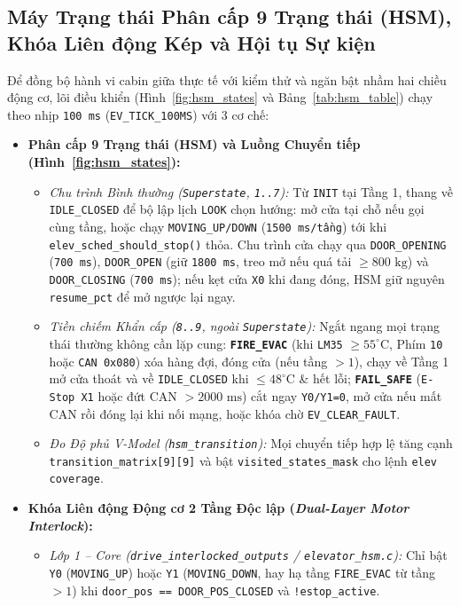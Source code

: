 \subsection{Máy Trạng thái Phân cấp 9 Trạng thái (HSM), Khóa Liên động Kép và Hội tụ Sự kiện}
Để đồng bộ hành vi cabin giữa thực tế với kiểm thử và ngăn bật nhầm hai chiều động cơ, lõi điều khiển (Hình~\ref{fig:hsm_states} và Bảng~\ref{tab:hsm_table}) chạy theo nhịp \texttt{100~ms} (\texttt{EV\_TICK\_100MS}) với 3 cơ chế:
\begin{itemize}[nosep]
    \item \textbf{Phân cấp 9 Trạng thái (HSM) và Luồng Chuyển tiếp (Hình~\ref{fig:hsm_states}):}
    \begin{itemize}[nosep]
        \item \textit{Chu trình Bình thường (\texttt{Superstate}, \texttt{1..7}):} Từ \texttt{INIT} tại Tầng 1, thang về \texttt{IDLE\_CLOSED} để bộ lập lịch \texttt{LOOK} chọn hướng: mở cửa tại chỗ nếu gọi cùng tầng, hoặc chạy \texttt{MOVING\_UP/DOWN} (\texttt{1500~ms/tầng}) tới khi \texttt{elev\_sched\_should\_stop()} thỏa. Chu trình cửa chạy qua \texttt{DOOR\_OPENING} (\texttt{700~ms}), \texttt{DOOR\_OPEN} (giữ \texttt{1800~ms}, treo mở nếu quá tải $\ge 800\text{ kg}$) và \texttt{DOOR\_CLOSING} (\texttt{700~ms}); nếu kẹt cửa \texttt{X0} khi đang đóng, HSM giữ nguyên \texttt{resume\_pct} để mở ngược lại ngay.
        \item \textit{Tiền chiếm Khẩn cấp (\texttt{8..9}, ngoài \texttt{Superstate}):} Ngắt ngang mọi trạng thái thường không cần lặp cung: \textbf{\texttt{FIRE\_EVAC}} (khi \texttt{LM35} $\ge 55^\circ\text{C}$, Phím \texttt{10} hoặc \texttt{CAN 0x080}) xóa hàng đợi, đóng cửa (nếu tầng $>1$), chạy về Tầng 1 mở cửa thoát và về \texttt{IDLE\_CLOSED} khi $\le 48^\circ\text{C}$ \& hết lỗi; \textbf{\texttt{FAIL\_SAFE}} (\texttt{E-Stop X1} hoặc đứt CAN $>2000\text{ ms}$) cắt ngay \texttt{Y0/Y1=0}, mở cửa nếu mất CAN rồi đóng lại khi nối mạng, hoặc khóa chờ \texttt{EV\_CLEAR\_FAULT}.
        \item \textit{Đo Độ phủ V-Model (\texttt{hsm\_transition}):} Mọi chuyển tiếp hợp lệ tăng cạnh \texttt{transition\_matrix[9][9]} và bật \texttt{visited\_states\_mask} cho lệnh \texttt{elev coverage}.
    \end{itemize}
    \item \textbf{Khóa Liên động Động cơ 2 Tầng Độc lập (\textit{Dual-Layer Motor Interlock}):}
    \begin{itemize}[nosep]
        \item \textit{Lớp 1 -- Core (\texttt{drive\_interlocked\_outputs} / \texttt{elevator\_hsm.c}):} Chỉ bật \texttt{Y0} (\texttt{MOVING\_UP}) hoặc \texttt{Y1} (\texttt{MOVING\_DOWN}, hay hạ tầng \texttt{FIRE\_EVAC} từ tầng $>1$) khi \texttt{door\_pos == DOOR\_POS\_CLOSED} và \texttt{!estop\_active}.

\end{itemize}
\end{itemize}
